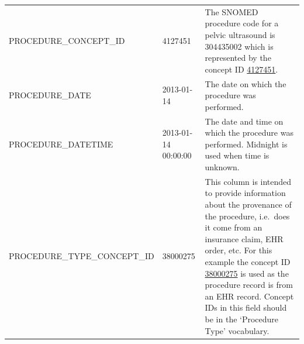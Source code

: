 \documentclass[]{book}
\begin{document}
\begin{longtable}[]{@{}lll@{}}
\begin{minipage}[t]{0.30\columnwidth}
PROCEDURE\_CONCEPT\_ID\strut
\end{minipage} & \begin{minipage}[t]{0.14\columnwidth}\raggedright\strut
4127451\strut
\end{minipage} & \begin{minipage}[t]{0.47\columnwidth}\raggedright\strut
The SNOMED procedure code for a pelvic ultrasound is 304435002 which is
represented by the concept ID
\href{http://athena.ohdsi.org/search-terms/terms/4127451}{4127451}.\strut
\end{minipage}\tabularnewline
\begin{minipage}[t]{0.30\columnwidth}\raggedright\strut
PROCEDURE\_DATE\strut
\end{minipage} & \begin{minipage}[t]{0.14\columnwidth}\raggedright\strut
2013-01-14\strut
\end{minipage} & \begin{minipage}[t]{0.47\columnwidth}\raggedright\strut
The date on which the procedure was performed.\strut
\end{minipage}\tabularnewline
\begin{minipage}[t]{0.30\columnwidth}\raggedright\strut
PROCEDURE\_DATETIME\strut
\end{minipage} & \begin{minipage}[t]{0.14\columnwidth}\raggedright\strut
2013-01-14 00:00:00\strut
\end{minipage} & \begin{minipage}[t]{0.47\columnwidth}\raggedright\strut
The date and time on which the procedure was performed. Midnight is used
when time is unknown.\strut
\end{minipage}\tabularnewline
\begin{minipage}[t]{0.30\columnwidth}\raggedright\strut
PROCEDURE\_TYPE\_CONCEPT\_ID\strut
\end{minipage} & \begin{minipage}[t]{0.14\columnwidth}\raggedright\strut
38000275\strut
\end{minipage} & \begin{minipage}[t]{0.47\columnwidth}\raggedright\strut
This column is intended to provide information about the provenance of
the procedure, i.e.~does it come from an insurance claim, EHR order,
etc. For this example the concept ID
\href{http://athena.ohdsi.org/search-terms/terms/38000275}{38000275} is
used as the procedure record is from an EHR record. Concept IDs in this
field should be in the `Procedure Type' vocabulary.\strut

\end{minipage}
\end{longtable}
\end{document}
